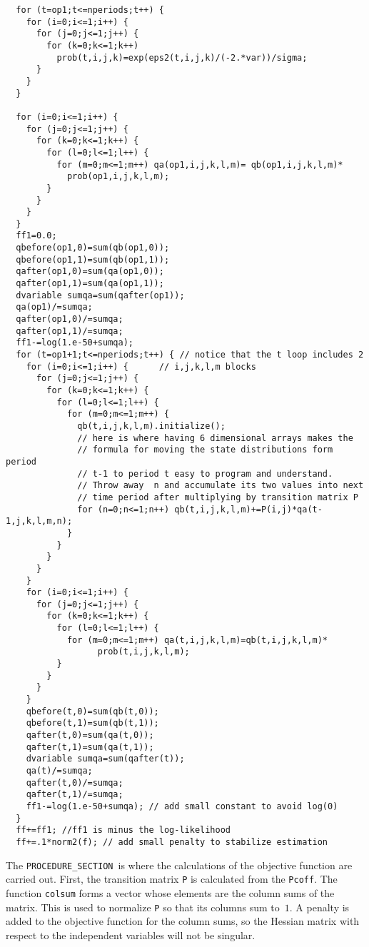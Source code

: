 \documentclass{admbmanual}
\newcommand\PROS{\texttt{PROCEDURE\_SECTION}}
\begin{document}
\begin{lstlisting}
  for (t=op1;t<=nperiods;t++) {
    for (i=0;i<=1;i++) {
      for (j=0;j<=1;j++) {
        for (k=0;k<=1;k++)
          prob(t,i,j,k)=exp(eps2(t,i,j,k)/(-2.*var))/sigma;
      }
    }
  }

  for (i=0;i<=1;i++) {
    for (j=0;j<=1;j++) {
      for (k=0;k<=1;k++) {
        for (l=0;l<=1;l++) {
          for (m=0;m<=1;m++) qa(op1,i,j,k,l,m)= qb(op1,i,j,k,l,m)*
            prob(op1,i,j,k,l,m);
        }
      }
    }
  }
  ff1=0.0;
  qbefore(op1,0)=sum(qb(op1,0));
  qbefore(op1,1)=sum(qb(op1,1));
  qafter(op1,0)=sum(qa(op1,0));
  qafter(op1,1)=sum(qa(op1,1));
  dvariable sumqa=sum(qafter(op1));
  qa(op1)/=sumqa;
  qafter(op1,0)/=sumqa;
  qafter(op1,1)/=sumqa;
  ff1-=log(1.e-50+sumqa);
  for (t=op1+1;t<=nperiods;t++) { // notice that the t loop includes 2
    for (i=0;i<=1;i++) {      // i,j,k,l,m blocks
      for (j=0;j<=1;j++) {
        for (k=0;k<=1;k++) {
          for (l=0;l<=1;l++) {
            for (m=0;m<=1;m++) {
              qb(t,i,j,k,l,m).initialize();
              // here is where having 6 dimensional arrays makes the
              // formula for moving the state distributions form period
              // t-1 to period t easy to program and understand.
              // Throw away  n and accumulate its two values into next
              // time period after multiplying by transition matrix P
              for (n=0;n<=1;n++) qb(t,i,j,k,l,m)+=P(i,j)*qa(t-1,j,k,l,m,n);
            }
          }
        }
      }
    }
    for (i=0;i<=1;i++) {
      for (j=0;j<=1;j++) {
        for (k=0;k<=1;k++) {
          for (l=0;l<=1;l++) {
            for (m=0;m<=1;m++) qa(t,i,j,k,l,m)=qb(t,i,j,k,l,m)*
                  prob(t,i,j,k,l,m);
          }
        }
      }
    }
    qbefore(t,0)=sum(qb(t,0));
    qbefore(t,1)=sum(qb(t,1));
    qafter(t,0)=sum(qa(t,0));
    qafter(t,1)=sum(qa(t,1));
    dvariable sumqa=sum(qafter(t));
    qa(t)/=sumqa;
    qafter(t,0)/=sumqa;
    qafter(t,1)/=sumqa;
    ff1-=log(1.e-50+sumqa); // add small constant to avoid log(0)
  }
  ff+=ff1; //ff1 is minus the log-likelihood
  ff+=.1*norm2(f); // add small penalty to stabilize estimation
\end{lstlisting}
The \PROS\ is where the calculations of the objective function are carried out.
First, the transition matrix \texttt{P} is calculated from the \texttt{Pcoff}.
The function \texttt{colsum} forms a vector whose elements are the column sums
of the matrix. This is used to normalize \texttt{P} so that its columns sum
to~$1$. A penalty is added to the objective function for the column sums, so the
Hessian matrix with respect to the independent variables will not be singular.
\end{document}
